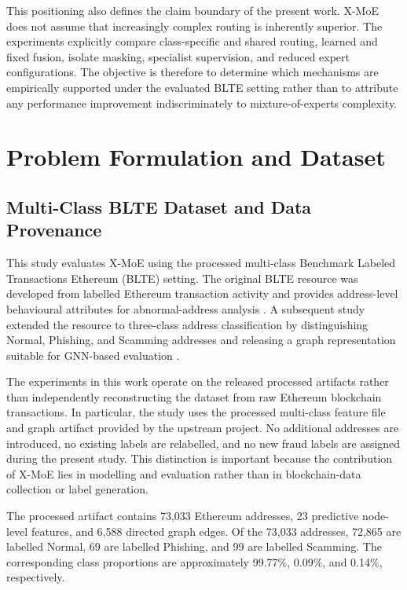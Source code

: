 \documentclass{ieeeaccess}
\begin{document}
This positioning also defines the claim boundary of the present work. X-MoE does not assume that increasingly complex routing is inherently superior. The experiments explicitly compare class-specific and shared routing, learned and fixed fusion, isolate masking, specialist supervision, and reduced expert configurations. The objective is therefore to determine which mechanisms are empirically supported under the evaluated BLTE setting rather than to attribute any performance improvement indiscriminately to mixture-of-experts complexity.


\section{Problem Formulation and Dataset}

\subsection{Multi-Class BLTE Dataset and Data Provenance}

This study evaluates X-MoE using the processed multi-class Benchmark Labeled Transactions Ethereum (BLTE) setting. The original BLTE resource was developed from labelled Ethereum transaction activity and provides address-level behavioural attributes for abnormal-address analysis \cite{alemari2021blte}. A subsequent study extended the resource to three-class address classification by distinguishing Normal, Phishing, and Scamming addresses and releasing a graph representation suitable for GNN-based evaluation \cite{alemari2026multiclass}.

The experiments in this work operate on the released processed artifacts rather than independently reconstructing the dataset from raw Ethereum blockchain transactions. In particular, the study uses the processed multi-class feature file and graph artifact provided by the upstream project. No additional addresses are introduced, no existing labels are relabelled, and no new fraud labels are assigned during the present study. This distinction is important because the contribution of X-MoE lies in modelling and evaluation rather than in blockchain-data collection or label generation.

The processed artifact contains 73,033 Ethereum addresses, 23 predictive node-level features, and 6,588 directed graph edges. Of the 73,033 addresses, 72,865 are labelled Normal, 69 are labelled Phishing, and 99 are labelled Scamming. The corresponding class proportions are approximately 99.77\%, 0.09\%, and 0.14\%, respectively.
\end{document}

